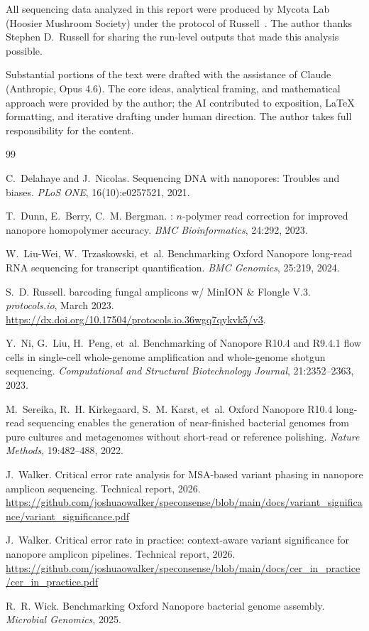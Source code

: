 \documentclass[11pt]{article}
\begin{document}
All sequencing data analyzed in this report were produced by Mycota Lab
(Hoosier Mushroom Society) under the protocol of
Russell~\cite{russell2023}. The author thanks Stephen D.~Russell for sharing
the run-level outputs that made this analysis possible.

Substantial portions of the text were drafted with the assistance of Claude
(Anthropic, Opus 4.6). The core ideas, analytical framing, and mathematical
approach were provided by the author; the AI contributed to exposition,
\LaTeX{} formatting, and iterative drafting under human direction. The author
takes full responsibility for the content.


\begin{thebibliography}{99}

C.~Delahaye and J.~Nicolas.
\newblock Sequencing {DNA} with nanopores: Troubles and biases.
\newblock \emph{PLoS ONE}, 16(10):e0257521, 2021.

T.~Dunn, E.~Berry, C.~M. Bergman.
: $n$-polymer read correction for improved nanopore
homopolymer accuracy.
\newblock \emph{BMC Bioinformatics}, 24:292, 2023.

W.~Liu-Wei, W.~Trzaskowski, et~al.
\newblock Benchmarking {Oxford Nanopore} long-read {RNA} sequencing for
transcript quantification.
\newblock \emph{BMC Genomics}, 25:219, 2024.

S.~D. Russell.
 barcoding fungal amplicons w/ {MinION \& Flongle V.3}.
\newblock \emph{protocols.io}, March 2023.
\newblock \url{https://dx.doi.org/10.17504/protocols.io.36wgq7qykvk5/v3}.

Y.~Ni, G.~Liu, H.~Peng, et~al.
\newblock Benchmarking of {Nanopore} {R10.4} and {R9.4.1} flow cells in
single-cell whole-genome amplification and whole-genome shotgun sequencing.
\newblock \emph{Computational and Structural Biotechnology Journal}, 21:2352--2363, 2023.

M.~Sereika, R.~H. Kirkegaard, S.~M. Karst, et~al.
\newblock Oxford {Nanopore} {R10.4} long-read sequencing enables the generation
of near-finished bacterial genomes from pure cultures and metagenomes without
short-read or reference polishing.
\newblock \emph{Nature Methods}, 19:482--488, 2022.

J.~Walker.
\newblock Critical error rate analysis for {MSA}-based variant phasing in
nanopore amplicon sequencing.
\newblock Technical report, 2026.
\newblock \url{https://github.com/joshuaowalker/speconsense/blob/main/docs/variant_significance/variant_significance.pdf}

J.~Walker.
\newblock Critical error rate in practice: context-aware variant significance
for nanopore amplicon pipelines.
\newblock Technical report, 2026.
\newblock \url{https://github.com/joshuaowalker/speconsense/blob/main/docs/cer_in_practice/cer_in_practice.pdf}

R.~R. Wick.
\newblock Benchmarking {Oxford Nanopore} bacterial genome assembly.
\newblock \emph{Microbial Genomics}, 2025.

\end{thebibliography}
\end{document}
